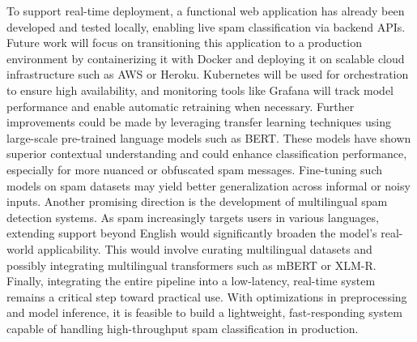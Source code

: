 \documentclass{article}
\begin{document}
\noindent
To support real-time deployment, a functional web application has already been developed and tested locally, enabling live spam classification via backend APIs. Future work will focus on transitioning this application to a production environment by containerizing it with Docker and deploying it on scalable cloud infrastructure such as AWS or Heroku. Kubernetes will be used for orchestration to ensure high availability, and monitoring tools like Grafana will track model performance and enable automatic retraining when necessary. Further improvements could be made by leveraging transfer learning techniques using large-scale pre-trained language models such as BERT. These models have shown superior contextual understanding and could enhance classification performance, especially for more nuanced or obfuscated spam messages. Fine-tuning such models on spam datasets may yield better generalization across informal or noisy inputs. Another promising direction is the development of multilingual spam detection systems. As spam increasingly targets users in various languages, extending support beyond English would significantly broaden the model’s real-world applicability. This would involve curating multilingual datasets and possibly integrating multilingual transformers such as mBERT or XLM-R. Finally, integrating the entire pipeline into a low-latency, real-time system remains a critical step toward practical use. With optimizations in preprocessing and model inference, it is feasible to build a lightweight, fast-responding system capable of handling high-throughput spam classification in production.

\newpage
\end{document}

